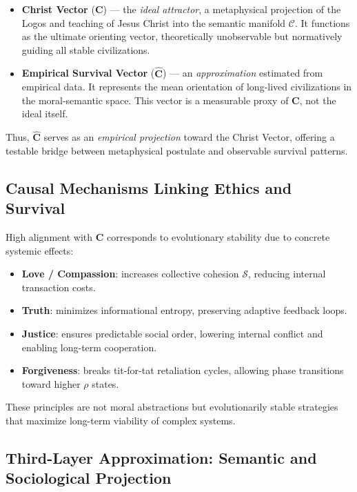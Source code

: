 \documentclass[11pt,a4paper]{article}
\theoremstyle{definition}
\theoremstyle{remark}
\begin{document}
\begin{itemize}
    \item \textbf{Christ Vector} ($\mathbf{C}$) --- the \emph{ideal attractor}, a metaphysical projection of the Logos and teaching of Jesus Christ into the semantic manifold $\mathcal{C}$. It functions as the ultimate orienting vector, theoretically unobservable but normatively guiding all stable civilizations.
    \item \textbf{Empirical Survival Vector} ($\hat{\mathbf{C}}$) --- an \emph{approximation} estimated from empirical data. It represents the mean orientation of long-lived civilizations in the moral-semantic space. This vector is a measurable proxy of $\mathbf{C}$, not the ideal itself.
\end{itemize}

Thus, $\hat{\mathbf{C}}$ serves as an \textit{empirical projection} toward the Christ Vector, offering a testable bridge between metaphysical postulate and observable survival patterns.


\subsection{Causal Mechanisms Linking Ethics and Survival}

High alignment with $\mathbf{C}$ corresponds to evolutionary stability due to concrete systemic effects:

\begin{itemize}
    \item \textbf{Love / Compassion}: increases collective cohesion $\mathcal{S}$, reducing internal transaction costs.
    \item \textbf{Truth}: minimizes informational entropy, preserving adaptive feedback loops.
    \item \textbf{Justice}: ensures predictable social order, lowering internal conflict and enabling long-term cooperation.
    \item \textbf{Forgiveness}: breaks tit-for-tat retaliation cycles, allowing phase transitions toward higher $\rho$ states.
\end{itemize}

These principles are not moral abstractions but evolutionarily stable strategies that maximize long-term viability of complex systems.


\subsection{Third-Layer Approximation: Semantic and Sociological Projection}
\end{document}
